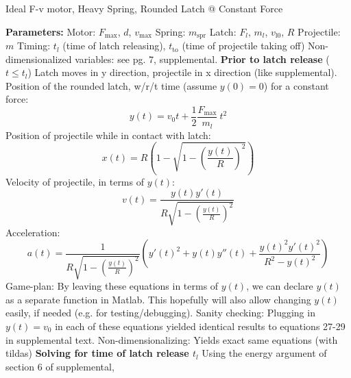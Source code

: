 \documentclass[12pt]{article}
\begin{document}
\begin{center}
Ideal F-v motor, Heavy Spring, Rounded Latch @ Constant Force
\end{center}

\noindent \textbf{Parameters:}
\newline
Motor: $F_{\text{max}}$, $d$, $v_{\text{max}}$ \newline
Spring: $m_{\text{spr}}$ \newline
Latch: $F_l$, $m_l$, $v_{\text{l0}}$, $R$ \newline
Projectile: $m$ \newline
Timing: $t_l$ (time of latch releasing), $t_{\text{to}}$ (time of projectile taking off)
\newline
Non-dimensionalized variables: see pg. 7, supplemental.
\newline \newline
\noindent \textbf{Prior to latch release} ($t \leq t_l$)
\newline
Latch moves in y direction, projectile in x direction (like supplemental).
\newline
Position of the rounded latch, w/r/t time (assume $y(0) = 0$) for a constant force:
\[ 
    y(t) = v_0 t + \frac{1}{2} \frac{F_{\text{max}}}{m_l}\ t^2
\]
Position of projectile while in contact with latch:
\[
    x(t) = R \left(1 - \sqrt{1-\left( \frac{y(t)}{R} \right) ^2}\right)
\]
Velocity of projectile, in terms of $y(t)$:
\[
    v(t) = \frac{y(t)y'(t)}{R\sqrt{1 - \left(\frac{y(t)}{R}\right)^2}}
\]
Acceleration:
\[
    a(t) = \frac{1}{R \sqrt{1 - \left( \frac{y(t)}{R} \right) ^2}} \left( y'(t)^2 + y(t)y''(t) + \frac{y(t)^2 y'(t)^2}{R^2 - y(t)^2}\right)
\]
\newline
Game-plan: By leaving these equations in terms of $y(t)$, we can declare $y(t)$ as a separate function in Matlab. This hopefully will also allow changing $y(t)$ easily, if needed (e.g. for testing/debugging).
\newline \newline
Sanity checking: Plugging in $y(t) = v_0$ in each of these equations yielded identical results to equations 27-29 in supplemental text.
\newline \newline
Non-dimensionalizing: Yields exact same equations (with tildas)
\newline 
\newline
\noindent \textbf{Solving for time of latch release $t_l$}
\newline
Using the energy argument of section 6 of supplemental,
\end{document}
